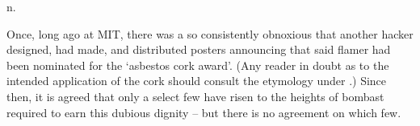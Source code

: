 n.

Once, long ago at MIT, there was a  so consistently obnoxious that another hacker designed, had made, and distributed
posters announcing that said flamer had been nominated for the `asbestos cork award'. (Any reader in doubt as to the intended application of
the cork should consult the etymology under .) Since then, it is agreed that only a select few have risen to the heights of
bombast required to earn this dubious dignity -- but there is no agreement on which few.


